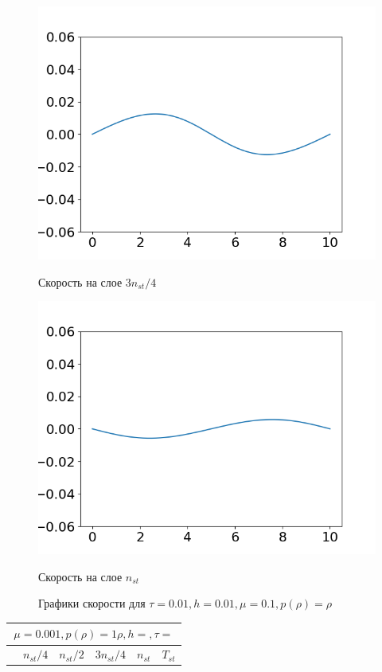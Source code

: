 \documentclass[12pt,a4paper]{article}
\begin{document}
\begin{figure}[h]
\begin{minipage}[h]{0.47\linewidth}
		\includegraphics[width=1\linewidth]{pics/task2/34u_1.png} 
		\caption{Скорость на слое $3n_{st} / 4$}
	\end{minipage}
	\hfill
	\begin{minipage}[h]{0.47\linewidth}
		\centering
		\includegraphics[width=1\linewidth]{pics/task2/44u_1.png} 
		\caption{Скорость на слое $n_{st}$}
	\end{minipage}
	\caption{Графики скорости для $\tau = 0.01, h = 0.01, \mu = 0.1, p(\rho) = \rho$}
\end{figure}

\begin{tabular}{*{6}{|l}|}
    \hline
     \\
    \hline
    &$n_{st}/4 $&$ n_{st}/2$&$3n_{st}/4$&$n_{st}$&$T_{st}$ \\
    \hline
\end{tabular}
\end{document}
